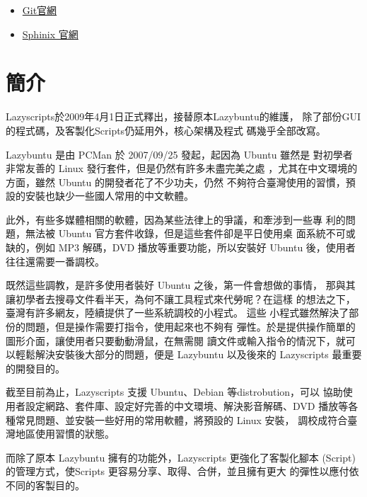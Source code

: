 \documentclass[letterpaper,10pt,english]{manual}
\begin{document}

\begin{itemize}
\item {} 
\href{http://git-scm.org}{Git官網}

\item {} 
\href{http://sphinx.pocoo.org/index.html}{Sphinix 官網}

\end{itemize}



\resetcurrentobjects


\chapter{簡介}

Lazyscripts於2009年4月1日正式釋出，接替原本Lazybuntu的維護，
除了部份GUI的程式碼，及客製化Scripts仍延用外，核心架構及程式
碼幾乎全部改寫。

Lazybuntu 是由 PCMan 於 2007/09/25 發起，起因為 Ubuntu 雖然是
對初學者非常友善的 Linux 發行套件，但是仍然有許多未盡完美之處
，尤其在中文環境的方面，雖然 Ubuntu 的開發者花了不少功夫，仍然
不夠符合臺灣使用的習慣，預設的安裝也缺少一些國人常用的中文軟體。

此外，有些多媒體相關的軟體，因為某些法律上的爭議，和牽涉到一些專
利的問題，無法被 Ubuntu 官方套件收錄，但是這些套件卻是平日使用桌
面系統不可或缺的，例如 MP3 解碼，DVD 播放等重要功能，所以安裝好
Ubuntu 後，使用者往往還需要一番調校。

既然這些調教，是許多使用者裝好 Ubuntu 之後，第一件會想做的事情，
那與其讓初學者去搜尋文件看半天，為何不讓工具程式來代勞呢？在這樣
的想法之下，臺灣有許多網友，陸續提供了一些系統調校的小程式。 這些
小程式雖然解決了部份的問題，但是操作需要打指令，使用起來也不夠有
彈性。於是提供操作簡單的圖形介面，讓使用者只要動動滑鼠，在無需閱
讀文件或輸入指令的情況下，就可以輕鬆解決安裝後大部分的問題，便是
Lazybuntu 以及後來的 Lazyscripts 最重要的開發目的。

截至目前為止，Lazyscripts 支援 Ubuntu、Debian 等distrobution，可以
協助使用者設定網路、套件庫、設定好完善的中文環境、解決影音解碼、DVD
播放等各種常見問題、並安裝一些好用的常用軟體，將預設的 Linux 安裝，
調校成符合臺灣地區使用習慣的狀態。

而除了原本 Lazybuntu 擁有的功能外，Lazyscripts 更強化了客製化腳本
(Script)的管理方式，使Scripts 更容易分享、取得、合併，並且擁有更大
的彈性以應付依不同的客製目的。
\end{document}
